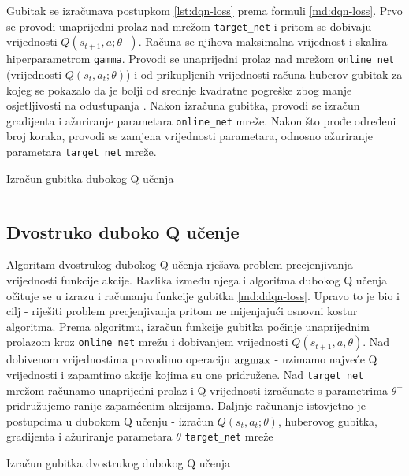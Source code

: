 Gubitak se izračunava postupkom \ref{lst:dqn-loss} prema formuli \ref{md:dqn-loss}. Prvo se provodi unaprijedni prolaz nad mrežom \texttt{target_net} i pritom se dobivaju vrijednosti $Q(s_{t+1}, a; \theta^-)$. Računa se njihova maksimalna vrijednost i skalira hiperparametrom \texttt{gamma}. Provodi se unaprijedni prolaz nad mrežom \texttt{online_net} (vrijednosti $Q(s_t, a_t; \theta)$) i od prikupljenih vrijednosti računa huberov gubitak za kojeg se pokazalo da je bolji od srednje kvadratne pogreške  zbog manje osjetljivosti na odustupanja . Nakon izračuna gubitka, provodi se izračun gradijenta i ažuriranje parametara \texttt{online_net} mreže. Nakon što prođe određeni broj koraka, provodi se zamjena vrijednosti parametara, odnosno ažuriranje parametara \texttt{target_net} mreže.

\begin{listing}[H]
    \caption{Izračun gubitka dubokog Q učenja}
    \inputminted{python}{snippets/dqn-loss.py}
    \label{lst:dqn-loss}
\end{listing}

\subsection{Dvostruko duboko Q učenje}

Algoritam dvostrukog dubokog Q učenja rješava problem precjenjivanja vrijednosti funkcije akcije. Razlika između njega i algoritma dubokog Q učenja očituje se u izrazu i računanju funkcije gubitka \ref{md:ddqn-loss}. Upravo to je bio i cilj - riješiti problem precjenjivanja pritom ne mijenjajući osnovni kostur algoritma. Prema algoritmu, izračun funkcije gubitka počinje unaprijednim prolazom kroz \texttt{online_net} mrežu i dobivanjem vrijednosti $Q(s_{t+1}, a, \theta)$. Nad dobivenom vrijednostima provodimo operaciju $\operatorname*{argmax}$ - uzimamo najveće Q vrijednosti i zapamtimo akcije kojima su one pridružene. Nad \texttt{target_net} mrežom računamo unaprijedni prolaz i Q vrijednosti izračunate s parametrima $\theta^-$ pridružujemo ranije zapamćenim akcijama. Daljnje računanje istovjetno je postupcima u dubokom Q učenju - izračun $Q(s_t, a_t; \theta)$, huberovog gubitka, gradijenta i ažuriranje parametara $\theta$ \texttt{target_net} mreže 

\begin{listing}[H]
    \caption{Izračun gubitka dvostrukog dubokog Q učenja}
    \inputminted{python}{snippets/ddqn-loss.py}
    \label{lst:ddqn-loss}
\end{listing}

